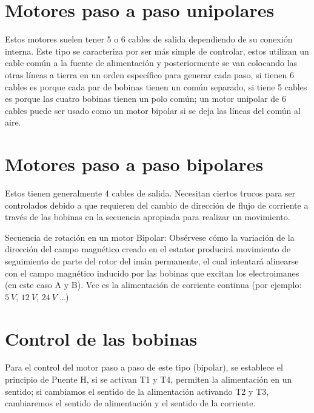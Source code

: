 \documentclass[../main]{subfiles}
\begin{document}
\section{Motores paso a paso unipolares}
Estos motores suelen tener 5 o 6 cables de salida dependiendo de su conexión interna. Este tipo se caracteriza por ser más simple de controlar, estos utilizan un cable común a la fuente de alimentación y posteriormente se van colocando las otras líneas a tierra en un orden específico para generar cada paso, si tienen 6 cables es porque cada par de bobinas tienen un común separado, si tiene 5 cables es porque las cuatro bobinas tienen un polo común; un motor unipolar de 6 cables puede ser usado como un motor bipolar si se deja las líneas del común al aire.

\section{Motores paso a paso bipolares}
Estos tienen generalmente 4 cables de salida. Necesitan ciertos trucos para ser controlados debido a que requieren del cambio de dirección de flujo de corriente a través de las bobinas en la secuencia apropiada para realizar un movimiento.

Secuencia de rotación en un motor Bipolar: Obsérvese cómo la variación de la dirección del campo magnético creado en el estator producirá movimiento de seguimiento de parte del rotor del imán permanente, el cual intentará alinearse con el campo magnético inducido por las bobinas que excitan los electroimanes (en este caso A y B). Vcc es la alimentación de corriente continua (por ejemplo: $\qty{5}{V}$, $\qty{12}{V}$, $\qty{24}{V}$ \dots)

\section{Control de las bobinas}

Para el control del motor paso a paso de este tipo (bipolar), se establece el principio de Puente H, si se activan T1 y T4, permiten la alimentación en un sentido; si cambiamos el sentido de la alimentación activando T2 y T3, cambiaremos el sentido de alimentación y el sentido de la corriente.
\end{document}
